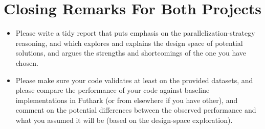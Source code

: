 \documentclass[a4paper,11pt]{article}
\begin{document}
\section{Closing Remarks For Both Projects}

\begin{itemize}
    \item Please write a tidy report that puts emphasis on the parallelization-strategy
            reasoning, and which explores and explains the design space of
            potential solutions, and argues the strengths and shortcomings of
            the one you have chosen.

    \item Please make sure your code validates at least on the provided datasets,
            and please compare the performance of your code against baseline 
            implementations in Futhark (or from elsewhere if you have other), 
            and comment on the potential differences between the observed
            performance and what you assumed it will be (based on the
            design-space exploration).

\end{itemize}



%
\end{document}
